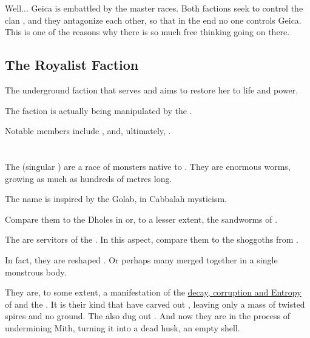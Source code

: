 Well... Geica is embattled by the master races. Both factions seek to control the clan , and they antagonize each other, so that in the end no one controls Geica. This is one of the reasons why there is so much free thinking going on there. 









\subsection{The Royalist Faction}
\label{Royalist Faction}
The underground faction that serves  and aims to restore her to life and power. 

The faction is actually being manipulated by the . 

Notable members include ,  and, ultimately, . 















\section{\Ghobaleth}
\label{Ghobaleth}
The \ghobaleth{} (singular \ghobal) are a race of monsters native to \Erebos. They are enormous worms, growing as much as hundreds of metres long. 

The name is inspired by the \Qliphah{} Golab, in Cabbalah mysticism.

Compare them to the Dholes in  or, to a lesser extent, the sandworms of . 

The \ghobaleth{} are servitors of the \banes. In this aspect, compare them to the shoggoths from . 

In fact, they are reshaped \banes. Or perhaps many \banes{} merged together in a single monstrous body. 

They are, to some extent, a manifestation of the \hyperref[Bane Entropy]{decay, corruption and Entropy} of \Erebos{} and the \banes. It is their kind that have carved out \Erebos, leaving only a mass of twisted spires and no ground. The also dug out \Nyx. And now they are in the process of undermining Mith, turning it into a dead husk, an empty shell. 

